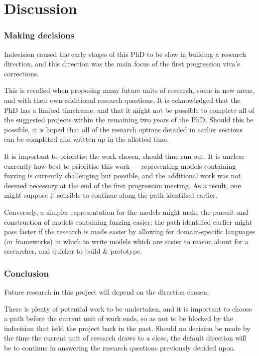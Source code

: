\documentclass[11pt]{article}
\newcommand{\ampersand}{\&}
\begin{document}
\part{Discussion}
\label{part:discussion}

\section{Making decisions}
\label{sec:org188061e}

Indecision caused the early stages of this PhD to be slow in building a research
direction, and this direction was the main focus of the first progression viva's
corrections.

This is recalled when proposing many future units of research, some in new
areas, and with their own additional research questions. It is acknowledged that
the PhD has a limited timeframe, and that it might not be possible to complete
all of the suggested projects within the remaining two years of the PhD. Should
this be possible, it is hoped that all of the research options detailed in
earlier sections can be completed and written up in the allotted time.

It is important to prioritise the work chosen, should time run out. It is
unclear currently how best to prioritise this work --- representing models
containing fuzzing is currently challenging but possible, and the additional
work was not deemed necessary at the end of the first progression meeting. As a
result, one might suppose it sensible to continue along the path identified
earlier.

Conversely, a simpler representation for the models might make the pursuit and
construction of models containing fuzzing easier; the path identified earlier
might pass faster if the research is made easier by allowing for domain-specific
languages (or frameworks) in which to write models which are easier to reason
about for a researcher, and quicker to build \ampersand{} prototype.


\section{Conclusion}
\label{sec:org3dd65d9}
Future research in this project will depend on the direction chosen. 

There is plenty of potential work to be undertaken, and it is important to
choose a path before the current unit of work ends, so as not to be blocked by
the indecision that held the project back in the past. Should no decision be
made by the time the current unit of research draws to a close, the default
direction will be to continue in answering the research questions previously
decided upon.
\end{document}
